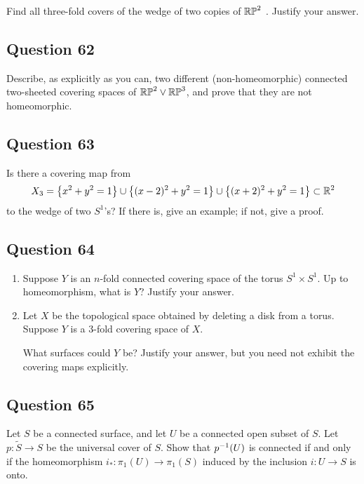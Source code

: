 \documentclass[12pt]{article}
\begin{document}
Find all three-fold covers of the wedge of two copies of \({\mathbb{RP}}^2\) .
Justify your answer.

\hypertarget{question-62-3}{%
\subsection{Question 62}\label{question-62-3}}

Describe, as explicitly as you can, two different (non-homeomorphic)
connected two-sheeted covering spaces of \({\mathbb{RP}}^2 \lor {\mathbb{RP}}^3\), and prove
that they are not homeomorphic.

\hypertarget{question-63-3}{%
\subsection{Question 63}\label{question-63-3}}

Is there a covering map from \[
X_3 = \left\{{x^2 + y^2 = 1}\right\} \cup \left\{{(x - 2)^2 + y^2 = 1}\right\} \cup \left\{{(x + 2)^2 + y^2 = 1}\right\} \subset {\mathbb{R}}^2
\] to the wedge of two \(S^1\)'s? If there is, give an example; if not,
give a proof.

\hypertarget{question-64-3}{%
\subsection{Question 64}\label{question-64-3}}

\begin{enumerate}
\def\labelenumi{\alph{enumi}.}
\item
  Suppose \(Y\) is an \(n\)-fold connected covering space of the torus
  \(S^1 \times S^1\). Up to homeomorphism, what is \(Y\)? Justify your
  answer.
\item
  Let \(X\) be the topological space obtained by deleting a disk from a
  torus. Suppose \(Y\) is a 3-fold covering space of \(X\).

  What surfaces could \(Y\) be? Justify your answer, but you need not
  exhibit the covering maps explicitly.
\end{enumerate}

\hypertarget{question-65-3}{%
\subsection{Question 65}\label{question-65-3}}

Let \(S\) be a connected surface, and let \(U\) be a connected open
subset of \(S\). Let \(p : \tilde S \to S\) be the universal cover of
\(S\). Show that \(p^{-1} (U )\) is connected if and only if the
homeomorphism \(i_\ast : \pi_1 (U ) \to \pi_1 (S)\) induced by the
inclusion \(i : U \to S\) is onto.
\end{document}
